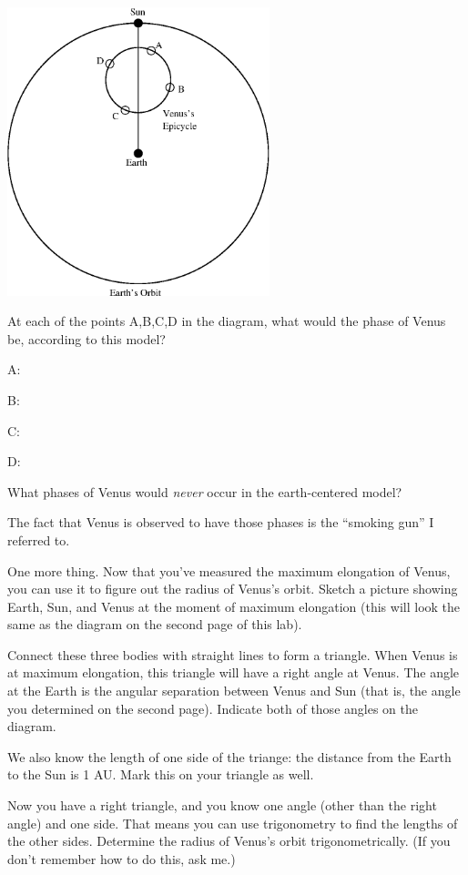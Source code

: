 \centerline{\includegraphics[width=3in]{phasesofvenus/venus2.eps}}


At each of the points A,B,C,D in the diagram, what would the phase
of Venus be, according to this model?

A:

B:

C: 

D:

What phases of Venus would {\it never} occur in the earth-centered
model?

\answerspace{0.7in}

The fact that Venus is observed to have those phases is the ``smoking
gun'' I referred to.

One more thing.  Now that you've measured the maximum elongation of
Venus, you can use it to figure out the radius of Venus's orbit.
Sketch a picture showing Earth, Sun, and Venus at the moment of 
maximum elongation (this will look the same as the diagram on the
second page of this lab).  

\answerspace{2.0in}

\pagebreak[2]

Connect these three bodies with straight lines to form a triangle.
When Venus is at maximum elongation, this triangle will have a right
angle at Venus.  The angle at the Earth is the angular separation
between Venus and Sun (that is, the angle you determined on the second page).
Indicate both of those angles on the diagram.

We also know the length of one side of the triange: the distance from
the Earth to the Sun is 1 AU.  Mark this on your triangle as well.

Now you have a right triangle, and you know one angle (other
than the right angle) and one side.
That means you can use trigonometry to find the lengths of the
other sides.  Determine the radius of Venus's orbit trigonometrically.
(If you don't remember how to do this, ask me.)



